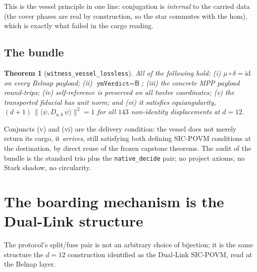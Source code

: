 \documentclass[12pt,a4paper]{article}
\newtheorem{theorem}{Theorem}[section]
\newcommand{\bB}{\textsf{B}}
\begin{document}
This is the vessel principle in one line: conjugation is \emph{internal}
to the carried data (the cover phases are real by construction, so the
star commutes with the hom), which is exactly what failed in the cargo
reading.

\subsection{The bundle}

\begin{theorem}[\texttt{witness\_vessel\_lossless}]
\label{thm:bundle}
All of the following hold:
(i) $\mu \circ \delta = \mathrm{id}$ on every Belnap payload;
(ii) $\texttt{ymVerdict} = \bB$;
(iii) the concrete MPP payload round-trips;
(iv) self-reference is preserved on all twelve coordinates;
(v) the transported fiducial has unit norm; and
(vi) it satisfies equiangularity,
$(d+1)\,\lVert\langle\psi, D_{a,b}\,\psi\rangle\rVert^2 = 1$
for all $143$ non-identity displacements at $d = 12$.
\end{theorem}

Conjuncts (v) and (vi) are the delivery condition: the vessel does not
merely return its cargo, it \emph{arrives}, still satisfying both defining
SIC-POVM conditions at the destination, by direct reuse of the frozen
capstone theorems. The audit of the bundle is the standard trio plus the
\texttt{native\_decide} pair; no project axioms, no Stark shadow, no
circularity.

\section{The boarding mechanism is the Dual-Link structure}
\label{sec:duallink}

The protocol's split/fuse pair is not an arbitrary choice of bijection; it
is the same structure the $d=12$ construction identified as the Dual-Link
SIC-POVM, read at the Belnap layer.
\end{document}
